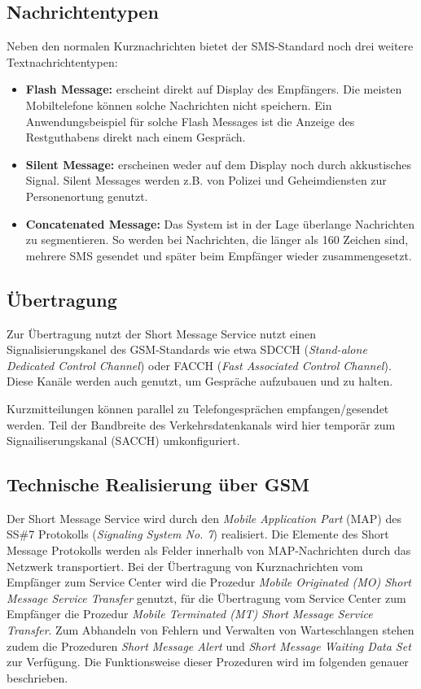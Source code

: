 \documentclass[german,12pt,a4paper]{article}
\begin{document}
\subsection{Nachrichtentypen}
Neben den normalen Kurznachrichten bietet der SMS-Standard noch drei weitere Textnachrichtentypen:
\begin{itemize}
	\item \textbf{Flash Message:} erscheint direkt auf Display des Empfängers. Die meisten Mobiltelefone 
        können solche Nachrichten nicht speichern. Ein Anwendungsbeispiel für solche Flash Messages ist die 
        Anzeige des Restguthabens direkt nach einem Gespräch.
	\item \textbf{Silent Message:} erscheinen weder auf dem Display noch durch akkustisches Signal. 
		Silent Messages werden z.B. von Polizei und Geheimdiensten zur Personenortung genutzt.
	\item \textbf{Concatenated Message:} Das System ist in der Lage überlange 
Nachrichten zu segmentieren. So werden bei Nachrichten, die länger als 160 Zeichen 
sind, mehrere SMS gesendet und später beim Empfänger wieder zusammengesetzt.
\end{itemize}

\subsection{Übertragung}
Zur Übertragung nutzt der Short Message Service nutzt einen Signalisierungskanel des GSM-Standards wie etwa SDCCH 
(\textit{Stand-alone Dedicated Control Channel}) oder FACCH (\textit{Fast Associated Control Channel}). 
Diese Kanäle werden auch genutzt, um Gespräche aufzubauen und zu halten.

Kurzmitteilungen können parallel zu Telefongesprächen empfangen/gesendet werden. Teil der Bandbreite des 
Verkehrsdatenkanals wird hier temporär zum Signailiserungskanal (SACCH) umkonfiguriert\cite{wikipedia:sms}.


\subsection{Technische Realisierung über GSM}
Der Short Message Service wird durch den \textit{Mobile Application Part} (MAP) des SS\#7 Protokolls (\textit{Signaling 
System No. 7}) realisiert\cite{3gpp:map}. Die Elemente des Short Message Protokolls werden als Felder innerhalb von 
MAP-Nachrichten durch das Netzwerk transportiert. Bei der Übertragung von Kurznachrichten vom Empfänger zum
Service Center wird die Prozedur \textit{Mobile Originated (MO) Short Message Service Transfer} genutzt,
für die Übertragung vom Service Center zum Empfänger die Prozedur \textit{Mobile Terminated (MT) Short
Message Service Transfer}. Zum Abhandeln von Fehlern und Verwalten von Warteschlangen stehen zudem die 
Prozeduren \textit{Short Message Alert} und \textit{Short Message Waiting Data Set} 
zur Verfügung\cite{3gpp:map}. Die Funktionsweise dieser Prozeduren wird im folgenden genauer beschrieben.
\end{document}
